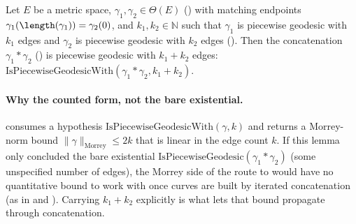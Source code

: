 \begin{lemma}
  Let $E$ be a metric space, $\gamma_1,\gamma_2 \in \Theta(E)$ () with matching
  endpoints $\gamma_1(\length(\gamma_1))=\gamma_2(0)$, and $k_1,k_2 \in \mathbb{N}$ such that
  $\gamma_1$ is piecewise geodesic with $k_1$ edges and $\gamma_2$ is piecewise geodesic with $k_2$
  edges (). Then the concatenation $\gamma_1 * \gamma_2$
  () is piecewise geodesic with $k_1 + k_2$ edges:
  $\mathrm{IsPiecewiseGeodesicWith}(\gamma_1 * \gamma_2, k_1 + k_2)$.

  \paragraph{Why the counted form, not the bare existential.}  consumes a
  hypothesis $\mathrm{IsPiecewiseGeodesicWith}(\gamma,k)$ and returns a Morrey-norm bound
  $\|\gamma\|_{\mathrm{Morrey}} \le 2k$ that is linear in the edge count $k$. If this lemma only
  concluded the bare existential $\mathrm{IsPiecewiseGeodesic}(\gamma_1*\gamma_2)$ (some
  unspecified number of edges), the Morrey side of the route to  would
  have no quantitative bound to work with once curves are built by iterated concatenation (as in
   and ). Carrying $k_1+k_2$ explicitly is
  what lets that bound propagate through concatenation.
\end{lemma}
